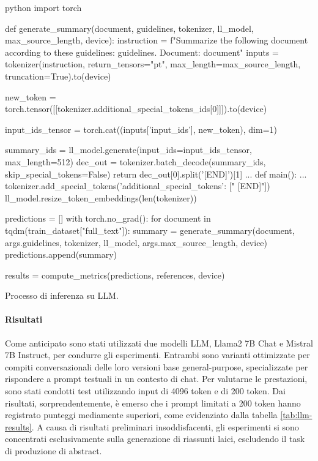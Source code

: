 \documentclass[12pt,a4paper,twoside,openright]{book}
\begin{document}
\begin{customcode}
\begin{mintedbox}{python}
import torch

def generate_summary(document, guidelines, tokenizer, ll_model, max_source_length, device):
    instruction = f"Summarize the following document according to these guidelines: {guidelines}. Document: {document}"
    inputs = tokenizer(instruction, return_tensors="pt", max_length=max_source_length, truncation=True).to(device)

    new_token = torch.tensor([[tokenizer.additional_special_tokens_ids[0]]]).to(device)
  
    input_ids_tensor = torch.cat((inputs['input_ids'], new_token), dim=1)

    summary_ids = ll_model.generate(input_ids=input_ids_tensor, max_length=512)
    dec_out = tokenizer.batch_decode(summary_ids, skip_special_tokens=False)
    return dec_out[0].split('[END]')[1]    
...
def main():
    ...
    tokenizer.add_special_tokens({'additional_special_tokens': [" [END]"]})
    ll_model.resize_token_embeddings(len(tokenizer))

    predictions = []
    with torch.no_grad():
        for document in tqdm(train_dataset["full_text"]):
            summary = generate_summary(document, args.guidelines, tokenizer, ll_model, args.max_source_length, device)
            predictions.append(summary)
    
    results = compute_metrics(predictions, references, device)
    
\end{mintedbox}
\caption{Processo di inferenza su LLM.}
\label{lst:infer-llm}
\end{customcode}

\paragraph{Risultati}
Come anticipato sono stati utilizzati due modelli LLM, Llama2 7B Chat e Mistral 7B Instruct, per condurre gli esperimenti. Entrambi sono varianti ottimizzate per compiti conversazionali delle loro versioni base general-purpose, specializzate per rispondere a prompt testuali in un contesto di chat. Per valutarne le prestazioni, sono stati condotti test utilizzando input di 4096 token e di 200 token. Dai risultati, sorprendentemente, è emerso che i prompt limitati a 200 token hanno registrato punteggi mediamente superiori, come evidenziato dalla tabella \ref{tab:llm-results}. A causa di risultati preliminari insoddisfacenti, gli esperimenti si sono concentrati esclusivamente sulla generazione di riassunti laici, escludendo il task di produzione di abstract.
\end{document}
